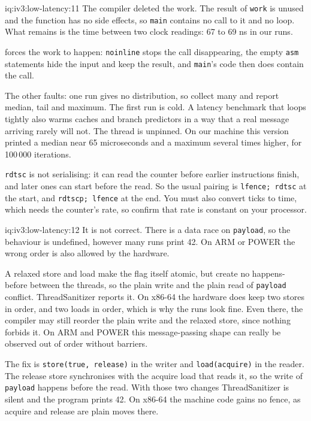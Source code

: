 \begin{solution}{iq:iv3:low-latency:11}
The compiler deleted the work. The result of \texttt{work} is unused and the function has no side effects, so \texttt{main} contains no call to it and no loop. What remains is the time between two clock readings: 67 to 69 ns in our runs.

 forces the work to happen: \texttt{noinline} stops the call disappearing, the empty \texttt{asm} statements hide the input and keep the result, and \texttt{main}'s code then does contain the call.
\label{lst:iv3:ll:benchgood}

The other faults: one run gives no distribution, so collect many and report median, tail and maximum. The first run is cold. A latency benchmark that loops tightly also warms caches and branch predictors in a way that a real message arriving rarely will not. The thread is unpinned. On our machine this version printed a median near 65 microseconds and a maximum several times higher, for 100\,000 iterations.

\texttt{rdtsc} is not serialising: it can read the counter before earlier instructions finish, and later ones can start before the read. So the usual pairing is \texttt{lfence; rdtsc} at the start, and \texttt{rdtscp; lfence} at the end. You must also convert ticks to time, which needs the counter's rate, so confirm that rate is constant on your processor.

\end{solution}

\begin{solution}{iq:iv3:low-latency:12}
It is not correct. There is a data race on \texttt{payload}, so the behaviour is undefined, however many runs print 42. On ARM or POWER the wrong order is also allowed by the hardware.

A relaxed store and load make the flag itself atomic, but create no happens-before between the threads, so the plain write and the plain read of \texttt{payload} conflict. ThreadSanitizer reports it. On x86-64 the hardware does keep two stores in order, and two loads in order, which is why the runs look fine. Even there, the compiler may still reorder the plain write and the relaxed store, since nothing forbids it. On ARM and POWER this message-passing shape can really be observed out of order without barriers.

The fix is \texttt{store(true, release)} in the writer and \texttt{load(acquire)} in the reader. The release store synchronises with the acquire load that reads it, so the write of \texttt{payload} happens before the read. With those two changes ThreadSanitizer is silent and the program prints 42. On x86-64 the machine code gains no fence, as acquire and release are plain moves there.

\end{solution}

